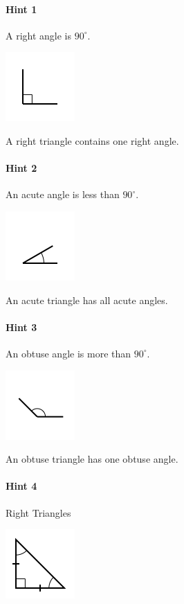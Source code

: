 \documentclass[twocolumn,10pt]{article}
\def\shrinkfactor{0.55}
\begin{document}
\paragraph{Hint 1}A right angle is $90 ^\circ$.

\includegraphics[scale=\shrinkfactor]{figures/e6ad77b54552295693aae7e39624ed456b552099.png}

A right triangle contains one right angle.

\paragraph{Hint 2}An acute angle is less than $90 ^\circ$.

\includegraphics[scale=\shrinkfactor]{figures/d3a2a4fb2274b18d8b340c80127ae99c1ed8b1f9.png}

An acute triangle has all acute angles.

\paragraph{Hint 3}An obtuse angle is more than $90 ^\circ$.

\includegraphics[scale=\shrinkfactor]{figures/3b29cb7bd47c46eb2ecd140dd305d1123b9185e6.png}

An obtuse triangle has one obtuse angle.

\paragraph{Hint 4}Right Triangles


\includegraphics[scale=\shrinkfactor]{figures/8837c2c90c5edbd24cdce3fa7e110370dd5dcdef.png}
\end{document}
